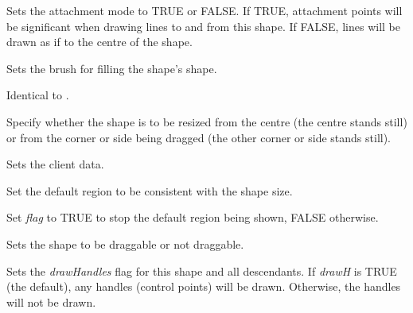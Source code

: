 
Sets the attachment mode to TRUE or FALSE. If TRUE, attachment points
will be significant when drawing lines to and from this shape.
If FALSE, lines will be drawn as if to the centre of the shape.



Sets the brush for filling the shape's shape.

\label{wxshapesetcanvas}


Identical to .



Specify whether the shape is to be resized from the centre (the centre stands still) or from the corner or side
being dragged (the other corner or side stands still).



Sets the client data.

\label{setdefaultregionsize}


Set the default region to be consistent with the shape size.



Set {\it flag} to TRUE to stop the default region being shown, FALSE otherwise.



Sets the shape to be draggable or not draggable.



Sets the {\it drawHandles} flag for this shape and all descendants. If {\it drawH} is TRUE (the default),
any handles (control points) will be drawn. Otherwise, the handles will not be drawn.

